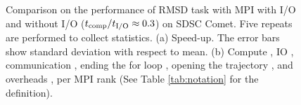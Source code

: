 \begin{figure}[ht!]
\caption{Comparison on the performance of RMSD task with MPI with I/O and without I/O (${t}_{\text{comp}}/{t}_{\text{I/O}} \approx 0.3$) on SDSC Comet.
Five repeats are performed to collect statistics. (a) Speed-up. The error bars show standard deviation with respect to mean.
(b) Compute \tcomp, IO \tIO, communication \tcomm, ending the for loop ,
  opening the trajectory , and overheads ,   per MPI rank (See Table \ref{tab:notation} for the definition).}
\label{fig:MPIwithoutIO}
\end{figure}
